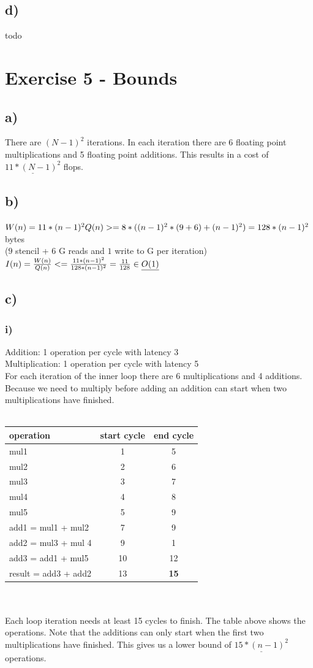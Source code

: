 \documentclass[10pt,a4paper,oneside,notitlepage]{report}
\begin{document}
\subsection*{d)}
todo

\section*{Exercise 5 - Bounds}
\subsection*{a)}
There are $(N-1)^2$ iterations. In each iteration there are 6 floating point multiplications and 5 floating point additions. This results in a cost of $\underline{11*(N-1)^2}$ flops.
\subsection*{b)}
$W(n) = 11*(n-1)^2 \\
Q(n) >= 8*((n-1)^2*(9 + 6) + (n-1)^2 ) = 128*(n-1)^2$  bytes \\($9$ stencil + $6$ G reads and $1$ write to G per iteration) \\
$I(n) = {W(n) \over Q(n)} <= {11*(n-1)^2 \over 128*(n-1)^2} = {11 \over 128} \in \underline{O(1)}$
\subsection*{c)}
\subsubsection*{i)}
Addition: 1 operation per cycle with latency 3 \\
Multiplication: 1 operation per cycle with latency 5 \\
For each iteration of the inner loop there are 6 multiplications and 4 additions. Because we need to multiply before adding an addition can start when two multiplications have finished.  \\ \\
\begin{tabular}{|l|c|c|}
\hline 
\rowcolor{gray!30}
\textbf{operation} & \textbf{start cycle} & \textbf{end cycle }\\ 
\hline 
mul1 & 1 & 5 \\ 
\hline 
mul2 & 2 & 6 \\ 
\hline 
mul3 & 3 & 7 \\ 
\hline 
mul4 & 4 & 8 \\ 
\hline 
mul5 & 5 & 9 \\ 
\hline 
add1 = mul1 + mul2 & 7 & 9 \\ 
\hline 
add2 = mul3 + mul 4 & 9 & 1 \\ 
\hline 
add3 = add1 + mul5 & 10 & 12 \\ 
\hline 
result = add3 + add2 & 13 & \textbf{15} \\ 
\hline 
\end{tabular}  \\ \\
Each loop iteration needs at least 15 cycles to finish. The table above shows the operations. Note that the additions can only start when the first two multiplications have finished. This gives us a lower bound of $\underline{15*(n-1)^2}$ operations.
\end{document}
